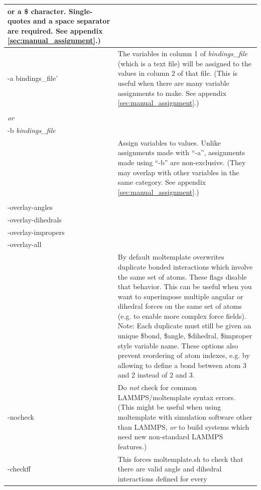 \documentclass[11pt]{article}
\begin{document}
\begin{longtable}[h]{l|p{10cm}}
 or a \$ character.  
 Single-quotes and a space separator are required.
 See appendix \ref{sec:manual_assignment}.)
\\
\hline
-a bindings\_file'
& 
The variables in column 1 of 
\textit{bindings\_file} 
(which is a text file) 
will be assigned to 
the values in column 2 of that file.
(This is useful when there are many variable assignments to make.
See appendix \ref{sec:manual_assignment}.)
\\
\hline
\begin{tabular}[t]{l}
-b '\textit{variable} \textit{value}'
\\
\hspace{0.35cm} \textit{or} \\
-b \textit{bindings\_file}
\\
\end{tabular}
& 
Assign variables to values.
Unlike assignments made with ``-a'',
assignments made using ``-b'' 
are non-exclusive.
(They may overlap with other variables in the same category.
 See appendix \ref{sec:manual_assignment}.)
\\
\hline
\begin{tabular}[t]{l}
-overlay-bonds
\\
-overlay-angles
\\
-overlay-dihedrals
\\
-overlay-impropers
\\
-overlay-all
\\
\end{tabular}
& 
By default moltemplate overwrites 
duplicate bonded interactions which
involve the same set of atoms.
These flags disable that behavior.
This can be useful when you want to superimpose 
multiple angular or dihedral forces on the same set of atoms
(e.g. to enable more complex force fields).
Note: Each duplicate must still be given an unique
\$bond, \$angle, \$dihedral, \$improper style variable name.
These options also prevent reordering of atom indexes,
e.g. by allowing to define a bond between
atom 3 and 2 instead of 2 and 3.
\\
\hline
-nocheck &
Do \textit{not} check for common LAMMPS/moltemplate syntax errors.
(This might be useful when using moltemplate 
 with simulation software other than LAMMPS,
 \textit{or} to build systems which need new non-standard LAMMPS features.)
\\
\hline
-checkff &
This forces moltemplate.sh to check that there
are valid angle and dihedral interactions defined for every

\end{longtable}
\end{document}
